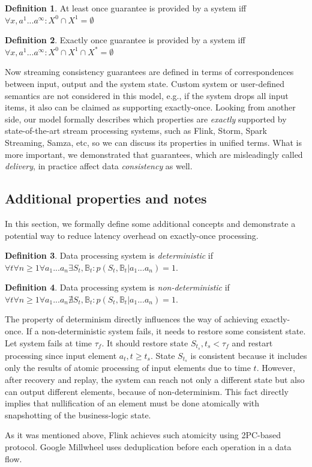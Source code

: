 \documentclass[sigconf]{acmart}
\theoremstyle{definition}
\newtheorem{definition}{Definition}
\begin{document}
\begin{definition}{At least once}
guarantee is provided by a system iff $\forall{x,a^{1}...a^\infty}:X^{0}\cap{X^{1}}=\emptyset$
\end{definition}

\begin{definition}{Exactly once}
guarantee is provided by a system iff $\forall{x,a^{1}...a^\infty}:X^{0}\cap{X^{1}}\cap{X^{*}}=\emptyset$
\end{definition}

Now streaming consistency guarantees are defined in terms of correspondences between input, output and the system state. Custom system or user-defined semantics are not considered in this model, e.g., if the system drops all input items, it also can be claimed as supporting exactly-once. Looking from another side, our model formally describes which properties are {\em exactly} supported by state-of-the-art stream processing systems, such as Flink, Storm, Spark Streaming, Samza, etc, so we can discuss its properties in unified terms. What is more important, we demonstrated that guarantees, which are misleadingly called {\em delivery}, in practice affect data {\em consistency} as well.

\subsection{Additional properties and notes}
 
In this section, we formally define some additional concepts and demonstrate a potential way to reduce latency overhead on exactly-once processing.

\begin{definition}{Data processing system is {\em deterministic}}
if \\
$\forall{t} \forall{n\geq1} \forall{a_1...a_n}\exists{S_t,\mathbb{B}_t}:p(S_t,\mathbb{B}_t|a_1...a_n)=1$.
\end{definition}

\begin{definition}{Data processing system is {\em non-deterministic}}
if \\
$\forall{t} \forall{n\geq1} \forall{a_1...a_n}\nexists{S_t,\mathbb{B}_t}:p(S_t,\mathbb{B}_t|a_1...a_n)=1$.
\end{definition}

The property of determinism directly influences the way of achieving exactly-once. If a non-deterministic system fails, it needs to restore some consistent state. Let system fails at time $\tau_f$. It should restore state $S_{t_s}, t_s < \tau_f$ and restart processing since input element $a_t, t\geq{t_s}$. State $S_{t_s}$ is consistent because it includes only the results of atomic processing of input elements due to time $t$. However, after recovery and replay, the system can reach not only a different state but also can output different elements, because of non-determinism. This fact directly implies that nullification of an element must be done atomically with snapshotting of the business-logic state.

As it was mentioned above, Flink achieves such atomicity using 2PC-based protocol. Google Millwheel uses deduplication before each operation in a data flow.



\end{document}
